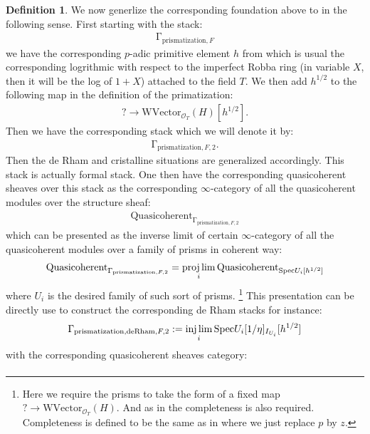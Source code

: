 \documentclass[12pt]{article}
\theoremstyle{definition}
\newtheorem{definition}{Definition}
\begin{document}
\begin{definition}
We now generlize the corresponding foundation above to \cite{BSB} in the following sense. First starting with the stack:
\begin{align}
\mathrm{\Gamma}_{\mathrm{prismatization},F}
\end{align}
we have the corresponding $p$-adic primitive element $h$ from \cite{BSB} which is usual the corresponding logrithmic with respect to the imperfect Robba ring (in variable $X$, then it will be the log of $1+X$) attached to the field $T$. We then add $h^{1/2}$ to the following map in the definition of the primatization:
\begin{align}
?\rightarrow \mathrm{WVector}_{\mathcal{O}_T}(H)[h^{1/2}].
\end{align}
Then we have the corresponding stack which we will denote it by:
\begin{align}
\mathrm{\Gamma}_{\mathrm{prismatization},F,2}.
\end{align}
Then the de Rham and cristalline situations are generalized accordingly. This stack is actually formal stack. One then have the corresponding quasicoherent sheaves over this stack as the corresponding $\infty$-category of all the quasicoherent modules over the structure sheaf:
\begin{align}
\mathrm{Quasicoherent}_{\mathrm{\Gamma}_{\mathrm{prismatization},F,2}}
\end{align}
which can be presented as the inverse limit of certain $\infty$-category of all the quasicoherent modules over a family of prisms in coherent way:
\begin{align}
\mathrm{Quasicoherent}_{\mathrm{\Gamma}_{\mathrm{prismatization},F,2}}=\projlim_i \mathrm{Quasicoherent}_{\mathrm{Spec}U_i[h^{1/2}]}
\end{align}
where $U_i$ is the desired family of such sort of prisms. \footnote{Here we require the prisms to take the form of a fixed map $?\rightarrow \mathrm{WVector}_{\mathcal{O}_T}(H)$. And as in \cite{BSI} the completeness is also required. Completeness is defined to be the same as in \cite{BSI} where we just replace $p$ by $z$.} This presentation can be directly use to construct the corresponding de Rham stacks for instance:
\begin{align}
\mathrm{\Gamma}_{\mathrm{prismatization},\mathrm{deRham},F,2}:=\injlim_i \mathrm{Spec}U_i[1/\eta]_{I_{U_i}}[h^{1/2}]
\end{align}
with the corresponding quasicoherent sheaves category:
\begin{align}

\end{align}
\end{definition}
\end{document}
